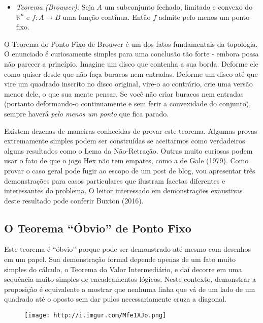 \documentclass[]{article}
\providecommand{\tightlist}{%
  \setlength{\itemsep}{0pt}\setlength{\parskip}{0pt}}
\begin{document}
\begin{itemize}
\tightlist
\item
  \emph{Teorema (Brouwer):} Seja \(A\) um subconjunto fechado, limitado
  e convexo do \(\mathbb{R}^n\) e \(f: A \to B\) uma função contínua.
  Então \(f\) admite pelo menos um ponto fixo.
\end{itemize}

O Teorema do Ponto Fixo de Brouwer é um dos fatos fundamentais da
topologia. O enunciado é curiosamente simples para uma conclusão tão
forte - embora possa não parecer a princípio. Imagine um disco que
contenha a sua borda. Deforme ele como quiser desde que não faça buracos
nem entradas. Deforme um disco até que vire um quadrado inscrito no
disco original, vire-o ao contrário, crie uma versão menor dele, o que
sua mente pensar. Se você não criar buracos nem entradas (portanto
deformando-o continuamente e sem ferir a convexidade do conjunto),
sempre haverá \emph{pelo menos um ponto} que fica parado.

Existem dezenas de maneiras conhecidas de provar este teorema. Algumas
provas extremamente simples podem ser construídas se aceitarmos como
verdadeiros alguns resultados como o Lema da Não-Retração. Outras muito
curiosas podem usar o fato de que o jogo Hex não tem empates, como a de
Gale (1979). Como provar o caso geral pode fugir ao escopo de um post de
blog, vou apresentar três demonstrações para casos particulares que
ilustram facetas diferentes e interessantes do problema. O leitor
interessado em demonstrações exaustivas deste resultado pode conferir
Buxton (2016).

\subsection{\texorpdfstring{O Teorema ``Óbvio'' de Ponto
Fixo}{O Teorema Óbvio de Ponto Fixo}}\label{o-teorema-obvio-de-ponto-fixo}

Este teorema é ``óbvio'' porque pode ser demonstrado até mesmo com
desenhos em um papel. Sua demonstração formal depende apenas de um fato
muito simples do cálculo, o Teorema do Valor Intermediário, e daí
decorre em uma sequência muito simples de encadeamentos lógicos. Neste
contexto, demonstrar a proposição é equivalente a mostrar que nenhuma
linha que vá de um lado de um quadrado até o oposto sem dar pulos
necessariamente cruza a diagonal.

\begin{figure}
\centering
\texttt{[image: http://i.imgur.com/Mfe1XJo.png]}
\caption{}
\end{figure}
\end{document}
